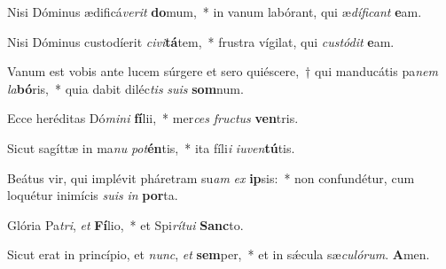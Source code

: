\item Nisi Dóminus ædificá\textit{ve}\textit{rit} \textbf{do}mum,~* in vanum labórant, qui æ\textit{dí}\textit{fi}\textit{cant} \textbf{e}am.

\item Nisi Dóminus custodíerit \textit{ci}\textit{vi}\textbf{tá}tem,~* frustra vígilat, qui \textit{cus}\textit{tó}\textit{dit} \textbf{e}am.

\item Vanum est vobis ante lucem súrgere et sero quiéscere,~† qui manducátis pa\textit{nem} \textit{la}\textbf{bó}ris,~* quia dabit diléc\textit{tis} \textit{su}\textit{is} \textbf{som}num.

\item Ecce heréditas Dó\textit{mi}\textit{ni} \textbf{fí}lii,~* mer\textit{ces} \textit{fruc}\textit{tus} \textbf{ven}tris.

\item Sicut sagíttæ in ma\textit{nu} \textit{pot}\textbf{én}tis,~* ita fíli\textit{i} \textit{iu}\textit{ven}\textbf{tú}tis.

\item Beátus vir, qui implévit pháretram su\textit{am} \textit{ex} \textbf{ip}sis:~* non confundétur, cum loquétur inimícis \textit{su}\textit{is} \textit{in} \textbf{por}ta.

\item Glória Pa\textit{tri}, \textit{et} \textbf{Fí}lio,~* et Spi\textit{rí}\textit{tu}\textit{i} \textbf{Sanc}to.

\item Sicut erat in princípio, et \textit{nunc}, \textit{et} \textbf{sem}per,~* et in sǽcula sæ\textit{cu}\textit{ló}\textit{rum}. \textbf{A}men.